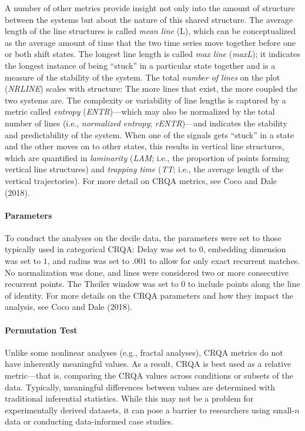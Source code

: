 \documentclass[english,man]{apa6}
\begin{document}
A number of other metrics provide insight not only into the amount of structure
between the systems but about the nature of this shared structure. The average
length of the line structures is called \emph{mean line} (L), which can be
conceptualized as the average amount of time that the two time series move
together before one or both shift states. The longest line length is called \emph{max
line} (\emph{maxL}); it indicates the longest instance of being \enquote{stuck} in a
particular state together and is a measure of the stability of the system. The
total \emph{number of lines} on the plot (\emph{NRLINE}) scales with structure: The more
lines that exist, the more coupled the two systems are. The complexity or
variability of line lengths is captured by a metric called \emph{entropy}
(\emph{ENTR})---which may also be normalized by the total number of lines (i.e.,
\emph{normalized entropy}; \emph{rENTR})---and indicates the stability and predictability
of the system. When one of the signals gets \enquote{stuck} in a state and the other
moves on to other states, this results in vertical line structures, which are
quantified in \emph{laminarity} (\emph{LAM}; i.e., the proportion of points forming
vertical line structures) and \emph{trapping time} (\emph{TT}; i.e., the average length of
the vertical trajectories). For more detail on CRQA metrics, see Coco and Dale (2018).

\hypertarget{parameters}{%
\paragraph{Parameters}\label{parameters}}

To conduct the analyses on the decile data, the parameters were set to those
typically used in categorical CRQA: Delay was set to \(0\), embedding dimension
was set to \(1\), and radius was set to \(.001\) to allow for only exact recurrent
matches. No normalization was done, and lines were considered two or more
consecutive recurrent points. The Theiler window was set to \(0\) to include
points along the line of identity. For more details on the CRQA parameters and
how they impact the analysis, see Coco and Dale (2018).

\hypertarget{permutation-test}{%
\paragraph{Permutation Test}\label{permutation-test}}

Unlike some nonlinear analyses (e.g., fractal analyses), CRQA metrics do not
have inherently meaningful values. As a result, CRQA is best used as a relative
metric---that is, comparing the CRQA values across conditions or subsets of the
data. Typically, meaningful differences between values are determined with
traditional inferential statistics. While this may not be a problem for
experimentally derived datasets, it can pose a barrier to researchers using
small-\(n\) data or conducting data-informed case studies.
\end{document}
